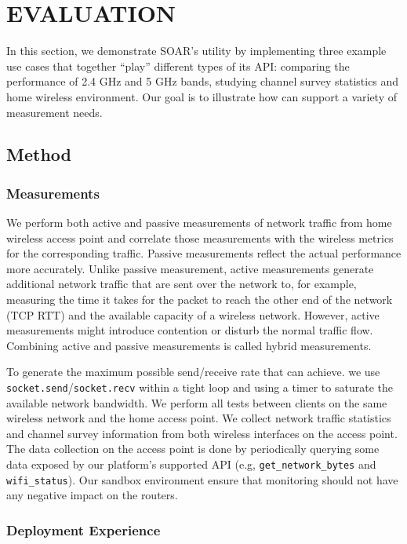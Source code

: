 \chapter{EVALUATION} 
\label{sec.evaluation}
In this section, we demonstrate SOAR's utility by implementing three example use cases that together ``play'' different types of its API: comparing the performance of 2.4 GHz and 5 GHz bands, studying channel survey statistics and home wireless environment. Our goal is to illustrate how \sysname can support a variety of measurement needs.
\section{Method}
\subsection{Measurements}
\label{ssec.measurements}

We perform both active and passive measurements of network traffic from home wireless access point and correlate those measurements with the wireless metrics for the corresponding traffic. Passive measurements reflect the actual performance more accurately. Unlike passive measurement, active measurements generate additional network traffic that are sent over the network to, for example, measuring the time it takes for the packet to reach the other end of the network (TCP RTT) and the available capacity of a wireless network. However, active measurements might introduce contention or disturb the normal traffic flow. Combining active and passive measurements is called hybrid measurements. 

To generate the maximum possible send/receive rate that \sysname can achieve. we use \texttt{socket.send}/\texttt{socket.recv} within a tight loop and using a timer to saturate the available network bandwidth. We perform all tests between clients on the same wireless network and the home access point. We collect network traffic statistics and channel survey information from both wireless interfaces on the access point. The data collection on the access point is done by periodically querying some data exposed by our platform's supported API (e.g, \texttt{get\_network\_bytes} and \texttt{wifi\_status}). Our sandbox environment ensure that monitoring should not have any negative impact on the routers. 
 
\subsection{Deployment Experience}
\label{ssec.deployment}

